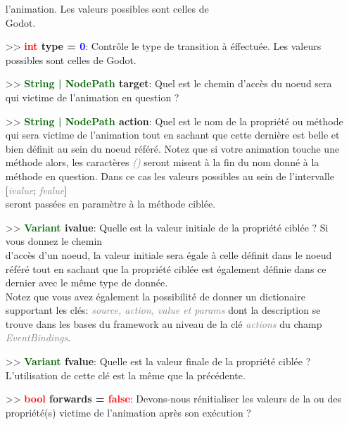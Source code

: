 \documentclass[a4paper, 11pt]{article}
\begin{document}
\begin{itemize}
		l'animation. Les valeurs possibles sont celles de \\Godot.\\
		\item[>> \textbf{\textcolor{red}{int} type = \textcolor{blue}{0}}:] Contrôle le type de transition à 
		éffectuée. Les valeurs possibles sont celles de Godot.\\
		\item[>> \textbf{\textcolor{darkgreen}{String | NodePath} target}:] Quel est le chemin d'accès du
		noeud sera qui victime de l'animation en question ?\\
		\item[>> \textbf{\textcolor{darkgreen}{String | NodePath} action}:] Quel est le nom de la propriété
		ou méthode qui sera victime de l'animation tout en sachant que cette dernière est belle et bien
		définit au sein du noeud référé. Notez que si votre animation touche une méthode alors, les
		caractères \textit{\textcolor{gray}{()}} seront misent à la fin du nom donné à la méthode en
		question. Dans ce cas les valeurs possibles au sein de l'intervalle [\textit{\textcolor{gray}
		{ivalue}}; \textit{\textcolor{gray}{fvalue}}] \\seront passées en paramètre à la méthode ciblée.\\
		\item[>> \textbf{\textcolor{darkgreen}{Variant} ivalue}:] Quelle est la valeur initiale de la 
		propriété ciblée ? Si vous donnez le chemin \\d'accès d'un noeud, la valeur initiale sera égale à
		celle définit dans le noeud référé tout en sachant que la propriété ciblée est également définie 
		dans ce dernier avec le même type de donnée. \\Notez que vous avez également la possibilité de 
		donner un dictionaire supportant les clés: \textit{\textcolor{gray}{source, action, value et
		params}} dont la description se trouve dans les bases du framework au niveau de la clé
		\textit{\textcolor{gray}{actions}} du champ \textit{\textcolor{gray}{EventBindings}}.\\
		\item[>> \textbf{\textcolor{darkgreen}{Variant} fvalue}:] Quelle est la valeur finale de la 
		propriété ciblée ? L'utilisation de cette clé est la même que la précédente.\\
		\item[>> \textbf{\textcolor{red}{bool} forwards = \textcolor{red}{false}}:] Devons-nous rénitialiser 
		les valeurs de la ou des propriété(s) victime de l'animation après son exécution ?\\

\end{itemize}
\end{document}
